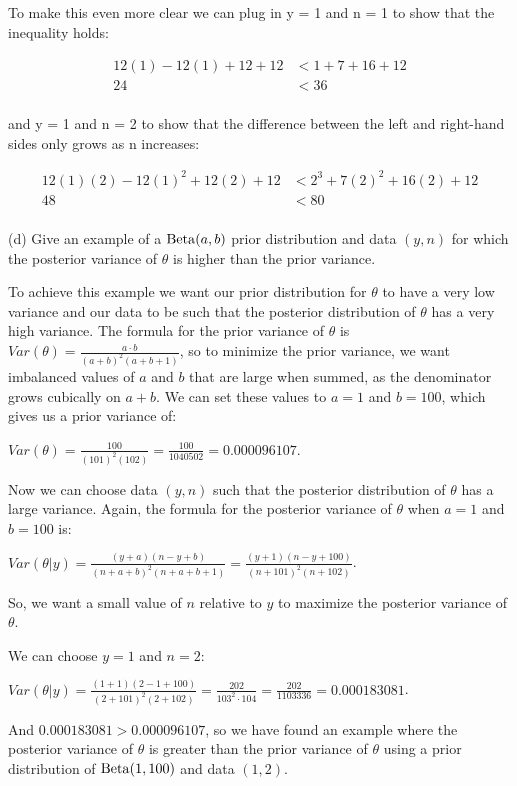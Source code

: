 \documentclass[12pt]{article}
\begin{document}
To make this even more clear we can plug in y = 1 and n = 1 to show that the inequality holds:

\begin{align*}
12(1) - 12(1) + 12 + 12 &< 1 + 7 + 16 + 12 \\
24 &< 36 \\
\end{align*}

and y = 1 and n = 2 to show that the difference between the left and right-hand sides only grows as n increases:

\begin{align*}
12(1)(2) - 12(1)^2 + 12(2) + 12 &< 2^3 + 7(2)^2 + 16(2) + 12 \\
48 &< 80 \\
\end{align*}


(d) Give an example of a ${\rm Beta}(a, b)$ prior distribution and data $(y,n)$ for which the posterior
variance of $\theta$ is higher than the prior variance.

To achieve this example we want our prior distribution for $\theta$ to have a very low variance
and our data to be such that the posterior distribution of $\theta$ has a very high variance. The formula for the
prior variance of $\theta$ is $Var(\theta) = \frac{a \cdot b}{(a + b)^2(a + b + 1)}$, so to minimize the prior variance,
we want imbalanced values of $a$ and $b$ that are large when summed, as the denominator grows cubically
on $a + b$. We can set these values to $a = 1$ and $b = 100$, which gives us a prior variance of:

$Var(\theta) = \frac{100}{(101)^2(102)} = \frac{100}{1040502} = 0.000096107$.

Now we can choose data $(y,n)$ such that the posterior distribution of $\theta$ has a large variance. Again, the formula
for the posterior variance of $\theta$ when $a = 1$ and $b = 100$ is:

$Var(\theta | y) = \frac{(y + a)(n - y + b)}{(n + a + b)^2(n + a + b + 1)} = \frac{(y + 1)(n - y + 100)}{(n + 101)^2(n + 102)}$.

So, we want a small value of $n$ relative to $y$ to maximize the posterior variance of $\theta$. 

We can choose $y = 1$ and $n = 2$:

$Var(\theta | y) = \frac{(1 + 1)(2 - 1 + 100)}{(2 + 101)^2(2 + 102)} = \frac{202}{103^2 \cdot 104} = \frac{202}{1103336} = 0.000183081$.

And $0.000183081 > 0.000096107$, so we have found an example where the posterior variance of $\theta$ is greater than the prior
variance of $\theta$ using a prior distribution of ${\rm Beta}(1, 100)$ and data $(1, 2)$.
\end{document}
